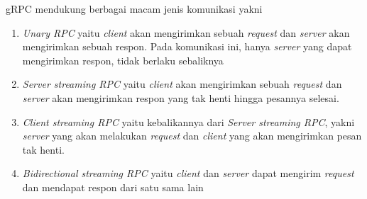     gRPC mendukung berbagai macam jenis komunikasi yakni
    \begin{enumerate}
        \item \textit{Unary RPC} yaitu \textit{client} akan mengirimkan sebuah \textit{request} dan \textit{server} akan mengirimkan sebuah respon. Pada komunikasi ini, hanya \textit{server} yang dapat mengirimkan respon, tidak berlaku sebaliknya
        \item \textit{Server streaming RPC} yaitu \textit{client} akan mengirimkan sebuah \textit{request} dan \textit{server} akan mengirimkan respon yang tak henti hingga pesannya selesai.
        \item \textit{Client streaming RPC} yaitu kebalikannya dari \textit{Server streaming RPC}, yakni \textit{server} yang akan melakukan \textit{request} dan \textit{client} yang akan mengirimkan pesan tak henti.
        \item \textit{Bidirectional streaming RPC} yaitu \textit{client} dan \textit{server} dapat mengirim \textit{request} dan mendapat respon dari satu sama lain
    \end{enumerate}
    




